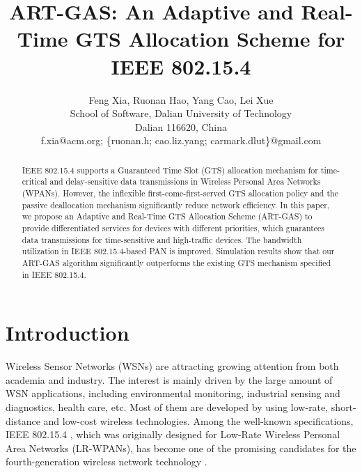 \documentclass[letterpaper]{sig-alternate-10pt}
\begin{document}
\title{ART-GAS: An Adaptive and Real-Time GTS Allocation Scheme for IEEE 802.15.4}



\author{Feng Xia, Ruonan Hao, Yang Cao, Lei Xue\\
School of Software, Dalian University of Technology\\Dalian 116620, China\\
f.xia@acm.org; \{ruonan.h; cao.liz.yang; carmark.dlut\}@gmail.com}




\maketitle
\begin{abstract}
 IEEE 802.15.4 supports a Guaranteed Time Slot (GTS) allocation mechanism for time-critical and delay-sensitive data transmissions in Wireless Personal Area Networks (WPANs). However, the inflexible first-come-first-served GTS allocation policy and the passive deallocation mechanism significantly reduce network efficiency. In this paper, we propose an Adaptive and Real-Time GTS Allocation Scheme (ART-GAS) to provide differentiated services for devices with different priorities, which guarantees data transmissions for time-sensitive and high-traffic devices. The bandwidth utilization in IEEE 802.15.4-based PAN is improved. Simulation results show that our ART-GAS algorithm significantly outperforms the existing GTS mechanism specified in IEEE 802.15.4.
\end{abstract}




\section{Introduction}
Wireless Sensor Networks (WSNs) are attracting growing attention from both academia and industry. The interest is mainly driven by the large amount of WSN applications, including environmental monitoring, industrial sensing and diagnostics, health care, etc. Most of them are developed by using low-rate, short-distance and low-cost wireless technologies. Among the well-known specifications, IEEE 802.15.4 \cite{1}, which was originally designed for Low-Rate Wireless Personal Area Networks (LR-WPANs), has become one of the promising candidates for the fourth-generation wireless network technology \cite{2}.
\end{document}
